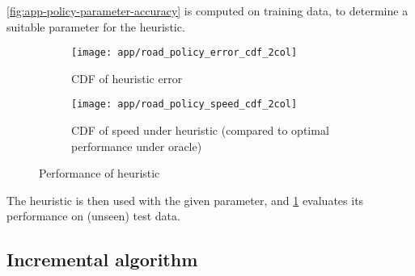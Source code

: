 \cref{fig:app-policy-parameter-accuracy} is computed on training data, to determine a suitable parameter for the heuristic.

\begin{figure}
    \begin{widepage}
    \begin{subfigure}[c]{0.5\textwidth}
      \texttt{[image: app/road\_policy\_error\_cdf\_2col]}
      \caption{CDF of heuristic error}
    \end{subfigure}
    \begin{subfigure}[c]{0.5\textwidth}
      \texttt{[image: app/road\_policy\_speed\_cdf\_2col]}
      \caption{CDF of speed under heuristic (compared to optimal performance under oracle)}
    \end{subfigure}
    \end{widepage}
    \caption{Performance of heuristic}
    \label{fig:app-cdf}
\end{figure}

The heuristic is then used with the given parameter, and \cref{fig:app-cdf} evaluates its performance on (unseen) test data.

%
%
%
%
%

\subsection{Incremental algorithm} \label{sec:eval-incremental}

